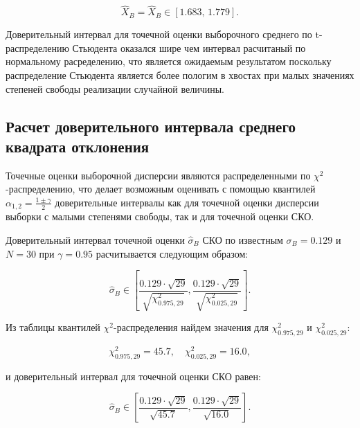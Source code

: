 \documentclass[
]{article}
\begin{document}
\[
\hat{X}_{B} = \hat{X}_{B} \in \left[ 1.683,\, 1.779 \right].
\]

Доверительный интервал для точечной оценки выборочного среднего по
t-распределению Стьюдента оказался шире чем интервал расчитаный по
нормальному расределению, что является ожидаемым результатом поскольку
распределение Стьюдента является более пологим в хвостах при малых
значениях степеней свободы реализации случайной величины.

\hypertarget{ux440ux430ux441ux447ux435ux442-ux434ux43eux432ux435ux440ux438ux442ux435ux43bux44cux43dux43eux433ux43e-ux438ux43dux442ux435ux440ux432ux430ux43bux430-ux441ux440ux435ux434ux43dux435ux433ux43e-ux43aux432ux430ux434ux440ux430ux442ux430-ux43eux442ux43aux43bux43eux43dux435ux43dux438ux44f}{%
\subsection{\texorpdfstring{\textbf{Расчет доверительного интервала
среднего квадрата
отклонения}}{Расчет доверительного интервала среднего квадрата отклонения}}\label{ux440ux430ux441ux447ux435ux442-ux434ux43eux432ux435ux440ux438ux442ux435ux43bux44cux43dux43eux433ux43e-ux438ux43dux442ux435ux440ux432ux430ux43bux430-ux441ux440ux435ux434ux43dux435ux433ux43e-ux43aux432ux430ux434ux440ux430ux442ux430-ux43eux442ux43aux43bux43eux43dux435ux43dux438ux44f}}

Точечные оценки выборочной дисперсии являются распределенными по
\(\chi^2\)-распределению, что делает возможным оценивать с помощью
квантилей \(\alpha_{1, 2}=\frac{1 \pm \gamma}{2}\) доверительные
интервалы как для точечной оценки дисперсии выборки с малыми степенями
свободы, так и для точечной оценки СКО.

Доверительный интервал точечной оценки \(\hat{\sigma}_{B}\) СКО по
известным \(\sigma_{B} = 0.129\) и \(N = 30\) при \(\gamma = 0.95\)
расчитывается следующим образом:

\[
\hat{\sigma}_{B} \in \left[ \frac{0.129 \cdot \sqrt{29}}{\sqrt{\chi_{0.975, 29}^2}},  \frac{0.129 \cdot \sqrt{29}}{\sqrt{\chi_{0.025, 29}^2}} \right].
\]

Из таблицы квантилей \(\chi^2\)-распределения найдем значения для
\(\chi_{0.975, 29}^2\) и \(\chi_{0.025, 29}^2\):

\[
\chi_{0.975, 29}^2 = 45.7, \quad \chi_{0.025, 29}^2 = 16.0,
\]

и доверительный интервал для точечной оценки СКО равен:

\[
\hat{\sigma}_{B} \in \left[ \frac{0.129 \cdot \sqrt{29}}{\sqrt{45.7}},  \frac{0.129 \cdot \sqrt{29}}{\sqrt{16.0}} \right].
\]
\end{document}
